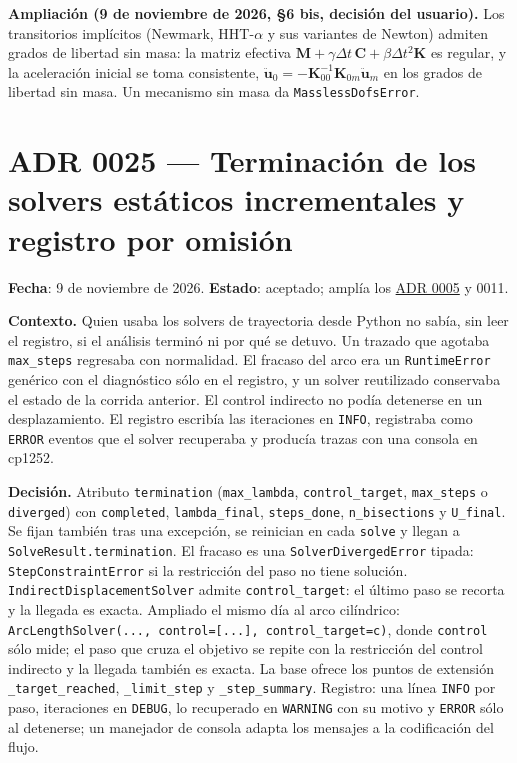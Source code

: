\documentclass[11pt,oneside]{report}
\begin{document}
\textbf{Ampliación (9 de noviembre de 2026, §6 bis, decisión del usuario).} Los transitorios implícitos (Newmark, HHT-\ensuremath{\alpha} y sus variantes de Newton) admiten grados de libertad sin masa: la matriz efectiva $\mathbf M + \gamma\Delta t\,\mathbf C + \beta\Delta t^2\mathbf K$ es regular, y la aceleración inicial se toma consistente, $\ddot{\mathbf u}_0 = -\mathbf K_{00}^{-1}\mathbf K_{0m}\ddot{\mathbf u}_m$ en los grados de libertad sin masa. Un mecanismo sin masa da \texttt{MasslessDofsError}.

\section{ADR 0025 --- Terminación de los solvers estáticos incrementales y registro por omisión}
\label{adr:0025}

\textbf{Fecha}: 9 de noviembre de 2026. \textbf{Estado}: aceptado; amplía los \hyperref[adr:0005]{ADR 0005} y 0011.

\textbf{Contexto.} Quien usaba los solvers de trayectoria desde Python no sabía, sin leer el registro, si el análisis terminó ni por qué se detuvo. Un trazado que agotaba \texttt{max\_steps} regresaba con normalidad. El fracaso del arco era un \texttt{RuntimeError} genérico con el diagnóstico sólo en el registro, y un solver reutilizado conservaba el estado de la corrida anterior. El control indirecto no podía detenerse en un desplazamiento. El registro escribía las iteraciones en \texttt{INFO}, registraba como \texttt{ERROR} eventos que el solver recuperaba y producía trazas con una consola en cp1252.

\textbf{Decisión.} Atributo \texttt{termination} (\texttt{max\_lambda}, \texttt{control\_target}, \texttt{max\_steps} o \texttt{diverged}) con \texttt{completed}, \texttt{lambda\_final}, \texttt{steps\_done}, \texttt{n\_bisections} y \texttt{U\_final}. Se fijan también tras una excepción, se reinician en cada \texttt{solve} y llegan a \texttt{SolveResult.\allowbreak{}termination}. El fracaso es una \texttt{SolverDivergedError} tipada: \texttt{StepConstraintError} si la restricción del paso no tiene solución. \texttt{IndirectDisplacementSolver} admite \texttt{control\_target}: el último paso se recorta y la llegada es exacta. Ampliado el mismo día al arco cilíndrico: \texttt{ArcLengthSolver(.\allowbreak{}.\allowbreak{}.\allowbreak{}, control=[.\allowbreak{}.\allowbreak{}.\allowbreak{}], control\_\allowbreak{}target=c)}, donde \texttt{control} sólo mide; el paso que cruza el objetivo se repite con la restricción del control indirecto y la llegada también es exacta. La base ofrece los puntos de extensión \texttt{\_target\_reached}, \texttt{\_limit\_step} y \texttt{\_step\_summary}. Registro: una línea \texttt{INFO} por paso, iteraciones en \texttt{DEBUG}, lo recuperado en \texttt{WARNING} con su motivo y \texttt{ERROR} sólo al detenerse; un manejador de consola adapta los mensajes a la codificación del flujo.
\end{document}
